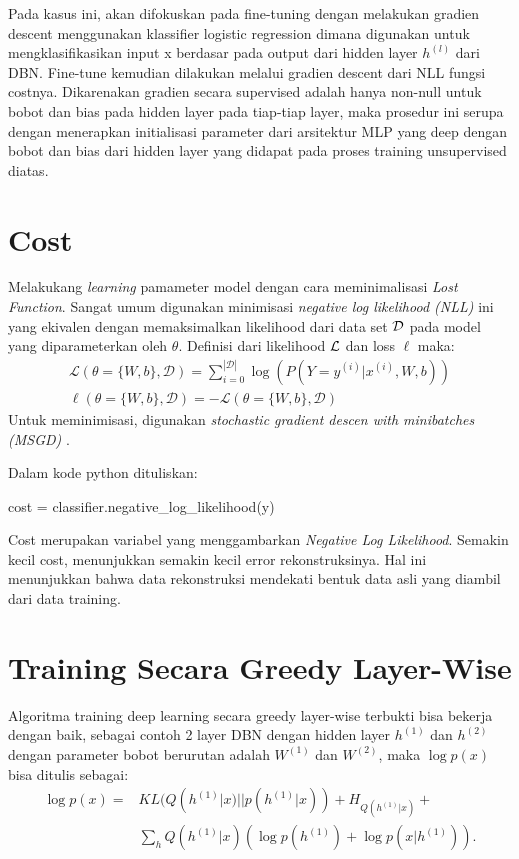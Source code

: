 Pada kasus ini, akan difokuskan pada fine-tuning dengan melakukan gradien descent menggunakan klassifier logistic regression dimana digunakan untuk mengklasifikasikan input x berdasar pada output dari hidden layer $h^{(l)}$ dari DBN. Fine-tune kemudian dilakukan melalui gradien descent dari NLL fungsi costnya. Dikarenakan gradien secara supervised adalah hanya non-null untuk bobot dan bias pada hidden layer pada tiap-tiap layer, maka prosedur ini serupa dengan menerapkan initialisasi parameter dari arsitektur MLP yang deep dengan bobot dan bias dari hidden layer yang didapat pada proses training unsupervised diatas.

\section{Cost}
Melakukang \textit{learning} pamameter model dengan cara meminimalisasi \textit{Lost Function}. Sangat umum digunakan minimisasi \textit{negative log likelihood (NLL)} ini yang ekivalen dengan memaksimalkan likelihood dari data set $\cal{D}$ pada model yang diparameterkan oleh $\theta$. Definisi dari likelihood $\cal{L}$ dan loss $\ell$ maka:
\begin{equation}
\begin{aligned}
\mathcal{L} (\theta=\{W,b\}, \mathcal{D}) =
  \sum_{i=0}^{|\mathcal{D}|} \log(P(Y=y^{(i)}|x^{(i)}, W,b)) \\
\ell (\theta=\{W,b\}, \mathcal{D}) = - \mathcal{L} (\theta=\{W,b\}, \mathcal{D})
\end{aligned}
\end{equation}
Untuk meminimisasi, digunakan \textit{stochastic gradient descen with minibatches (MSGD)} \citep{hinton2006fast}.

Dalam kode python dituliskan:
\begin{center}
cost = classifier.negative\_log\_likelihood(y)
\end{center}

Cost merupakan variabel yang menggambarkan \textit{Negative Log Likelihood}. Semakin kecil cost, menunjukkan semakin kecil error rekonstruksinya. Hal ini menunjukkan bahwa data rekonstruksi mendekati bentuk data asli yang diambil dari data training.


\section{Training Secara Greedy Layer-Wise}

Algoritma training deep learning secara greedy layer-wise terbukti bisa bekerja dengan baik, sebagai contoh 2 layer DBN dengan hidden layer $h^{(1)}$ dan $h^{(2)}$ dengan parameter bobot berurutan adalah $W^{(1)}$ dan $W^{(2)}$, \citep{hinton2006reducing} maka $\log
p(x)$ bisa ditulis sebagai:
\begin{equation}
\begin{aligned}
\log p(x) = &KL(Q(h^{(1)}|x)||p(h^{(1)}|x)) + H_{Q(h^{(1)}|x)} + \\
            &\sum_h Q(h^{(1)}|x)(\log p(h^{(1)}) + \log p(x|h^{(1)})).
\end{aligned}
\label{eq:equ2}
\end{equation}

